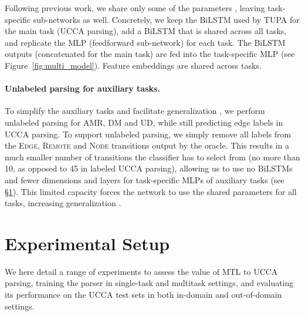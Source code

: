 \documentclass[11pt,a4paper]{article}
\begin{document}
Following previous work, we share only some of the parameters
\cite{N16-1179,P16-2038,C16-1013,C16-1059,C16-1179,E17-1005,P17-1186,Peng-EtAl:2018:NAACL},
leaving task-specific
sub-networks as well.
Concretely, we keep the BiLSTM used by TUPA for the main task (UCCA parsing),
add a BiLSTM that is shared across all tasks,
and replicate the MLP (feedforward sub-network) for each task.
The BiLSTM outputs (concatenated for the main task) are
fed into the task-specific MLP (see Figure~\ref{fig:multi_model}).
Feature embeddings are shared across tasks.

\paragraph{Unlabeled parsing for auxiliary tasks.}
To simplify the auxiliary tasks and facilitate generalization \cite{E17-2026},
we perform unlabeled parsing for AMR, DM and UD,
while still predicting edge labels in UCCA parsing.
To support unlabeled parsing, we simply remove all labels from the
\textsc{Edge}, \textsc{Remote} and \textsc{Node} transitions output by the oracle.
This results in a much smaller number of transitions the classifier has to select from
(no more than 10, as opposed to 45 in labeled UCCA parsing),
allowing us to use no BiLSTMs and fewer dimensions and layers for task-specific MLPs
of auxiliary tasks (see \S\ref{sec:experiments}).
This limited capacity forces the network to use the shared parameters for all tasks,
increasing generalization \cite{E17-1005}.



\section{Experimental Setup}\label{sec:experiments}

We here detail a range of experiments to assess the value of MTL to UCCA parsing,
training the parser in single-task and multitask settings,
and evaluating its performance on the UCCA test sets in both in-domain and out-of-domain settings.
\end{document}
